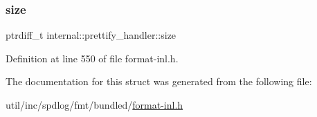 \mbox{\label{structinternal_1_1prettify__handler_a1cd507db31f66da340fbe3af614263a3}} 
\subsubsection{\texorpdfstring{size}{size}}
{\footnotesize\ttfamily ptrdiff\+\_\+t internal\+::prettify\+\_\+handler\+::size}



Definition at line 550 of file format-\/inl.\+h.



The documentation for this struct was generated from the following file\+:\begin{DoxyCompactItemize}
\item 
util/inc/spdlog/fmt/bundled/\hyperlink{format-inl_8h}{format-\/inl.\+h}\end{DoxyCompactItemize}
